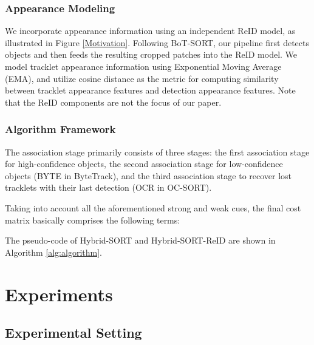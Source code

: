\documentclass[letterpaper]{article} \usepackage{aaai23}  \usepackage{times}  \usepackage{helvet}  \usepackage{courier}  \usepackage[hyphens]{url}  \usepackage{graphicx} \urlstyle{rm} \def\UrlFont{\rm}  \usepackage{natbib}  \usepackage{caption} \frenchspacing  \setlength{\pdfpagewidth}{8.5in}  \setlength{\pdfpageheight}{11in}  \usepackage{algorithm}
\begin{document}
\subsubsection{Appearance Modeling}
We incorporate appearance information using an independent ReID model, as illustrated in Figure \ref{Motivation}. Following BoT-SORT, our pipeline first detects objects and then feeds the resulting cropped patches into the ReID model. We model tracklet appearance information using Exponential Moving Average (EMA), and utilize cosine distance as the metric for computing similarity between tracklet appearance features and detection appearance features. Note that the ReID components are not the focus of our paper. 

\subsubsection{Algorithm Framework}
The association stage primarily consists of three stages: the first association stage for high-confidence objects, the second association stage for low-confidence objects (BYTE in ByteTrack), and the third association stage to recover lost tracklets with their last detection (OCR in OC-SORT). 

Taking into account all the aforementioned strong and weak cues, the final cost matrix basically comprises the following terms: 


The pseudo-code of Hybrid-SORT and Hybrid-SORT-ReID are shown in Algorithm \ref{alg:algorithm}. 





























\section{Experiments}
\subsection{Experimental Setting}
\end{document}
